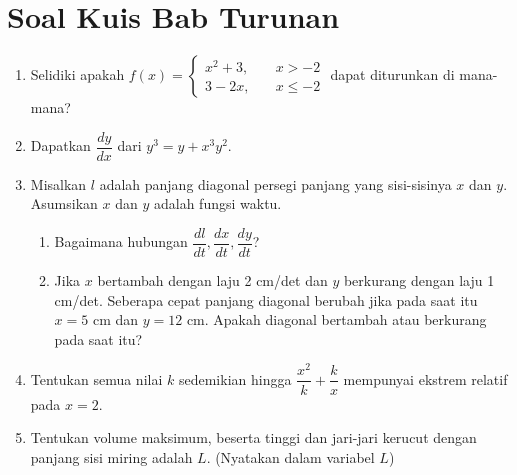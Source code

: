 \documentclass{article}
\begin{document}
\section*{Soal Kuis Bab Turunan}
\begin{enumerate}
	\item Selidiki apakah $f(x)=\begin{cases}x^2+3, \quad &x>-2\\
	3-2x,\quad &x\leq -2\end{cases}$ dapat diturunkan di mana-mana?
	\item Dapatkan $\dfrac{dy}{dx}$ dari $y^3 = y+x^3y^2$.
	\item Misalkan $l$ adalah panjang diagonal persegi panjang yang sisi-sisinya $x$ dan $y$. Asumsikan $x$ dan $y$ adalah fungsi waktu.
	\begin{enumerate}
		\item Bagaimana hubungan $\dfrac{dl}{dt},\dfrac{dx}{dt},\dfrac{dy}{dt}$?
		\item Jika $x$ bertambah dengan laju 2 cm/det dan $y$ berkurang dengan laju 1 cm/det. Seberapa cepat panjang diagonal berubah jika pada saat itu $x=5$ cm dan $y=12$ cm. Apakah diagonal bertambah atau berkurang pada saat itu?
	\end{enumerate}
	\item Tentukan semua nilai $k$ sedemikian hingga $\dfrac{x^2}{k}+\dfrac{k}{x}$ mempunyai ekstrem relatif pada $x=2$.
	\item Tentukan volume maksimum, beserta tinggi dan jari-jari kerucut dengan panjang sisi miring adalah $L$. (Nyatakan dalam variabel $L$)
\end{enumerate}
\newpage
\end{document}

